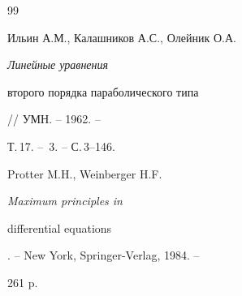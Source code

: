 \begin{thebibliography}{99}


Ильин А.М., Калашников А.С., Олейник О.А. {\em Линейные уравнения


второго порядка параболического типа} // УМН. -- 1962. --


Т.\,17. -- \No\,3. -- С.\,3--146.




Protter M.H., Weinberger H.F. {\em Maximum principles in


differential equations}. -- New York, Springer-Verlag, 1984. --


261 p.





\end{thebibliography}





\vskip 0.5cm














\label{end}





